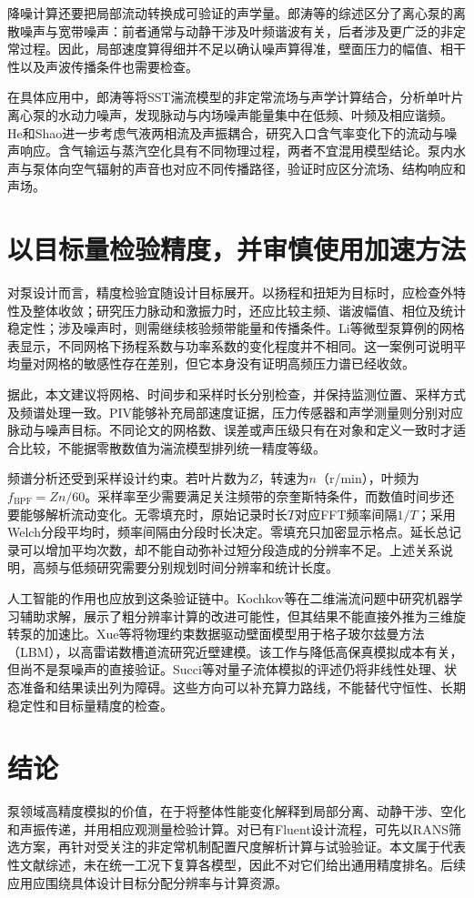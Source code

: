 降噪计算还要把局部流动转换成可验证的声学量。郎涛等的综述区分了离心泵的离散噪声与宽带噪声：前者通常与动静干涉及叶频谐波有关，后者涉及更广泛的非定常过程\cite{Lang2021NoiseReview}。因此，局部速度算得细并不足以确认噪声算得准，壁面压力的幅值、相干性以及声波传播条件也需要检查。

在具体应用中，郎涛等将SST湍流模型的非定常流场与声学计算结合，分析单叶片离心泵的水动力噪声，发现脉动与内场噪声能量集中在低频、叶频及相应谐频\cite{Lang2022SingleBladeNoise}。He和Shao进一步考虑气液两相流及声振耦合，研究入口含气率变化下的流动与噪声响应\cite{He2021TwoPhaseNoise}。含气输运与蒸汽空化具有不同物理过程，两者不宜混用模型结论。泵内水声与泵体向空气辐射的声音也对应不同传播路径，验证时应区分流场、结构响应和声场。

\section{以目标量检验精度，并审慎使用加速方法}

对泵设计而言，精度检验宜随设计目标展开。以扬程和扭矩为目标时，应检查外特性及整体收敛；研究压力脉动和激振力时，还应比较主频、谐波幅值、相位及统计稳定性；涉及噪声时，则需继续核验频带能量和传播条件。Li等微型泵算例的网格表显示，不同网格下扬程系数与功率系数的变化程度并不相同\cite{Li2021PulseFlow}。这一案例可说明平均量对网格的敏感性存在差别，但它本身没有证明高频压力谱已经收敛。

据此，本文建议将网格、时间步和采样时长分别检查，并保持监测位置、采样方式及频谱处理一致。PIV能够补充局部速度证据，压力传感器和声学测量则分别对应脉动与噪声目标。不同论文的网格数、误差或声压级只有在对象和定义一致时才适合比较，不能据零散数值为湍流模型排列统一精度等级。

频谱分析还受到采样设计约束。若叶片数为$Z$，转速为$n$（r/min），叶频为$f_{\mathrm{BPF}}=Zn/60$。采样率至少需要满足关注频带的奈奎斯特条件，而数值时间步还要能够解析流动变化。无零填充时，原始记录时长$T$对应FFT频率间隔$1/T$；采用Welch分段平均时，频率间隔由分段时长决定。零填充只加密显示格点。延长总记录可以增加平均次数，却不能自动弥补过短分段造成的分辨率不足。上述关系说明，高频与低频研究需要分别规划时间分辨率和统计长度。

人工智能的作用也应放到这条验证链中。Kochkov等在二维湍流问题中研究机器学习辅助求解，展示了粗分辨率计算的改进可能性，但其结果不能直接外推为三维旋转泵的加速比\cite{Kochkov2021MLCFD}。Xue等将物理约束数据驱动壁面模型用于格子玻尔兹曼方法（LBM），以高雷诺数槽道流研究近壁建模\cite{Xue2024LBMWall}。该工作与降低高保真模拟成本有关，但尚不是泵噪声的直接验证。Succi等对量子流体模拟的评述仍将非线性处理、状态准备和结果读出列为障碍\cite{Succi2023Quantum}。这些方向可以补充算力路线，不能替代守恒性、长期稳定性和目标量精度的检查。

\section{结论}

泵领域高精度模拟的价值，在于将整体性能变化解释到局部分离、动静干涉、空化和声振传递，并用相应观测量检验计算。对已有Fluent设计流程，可先以RANS筛选方案，再针对受关注的非定常机制配置尺度解析计算与试验验证。本文属于代表性文献综述，未在统一工况下复算各模型，因此不对它们给出通用精度排名。后续应用应围绕具体设计目标分配分辨率与计算资源。

